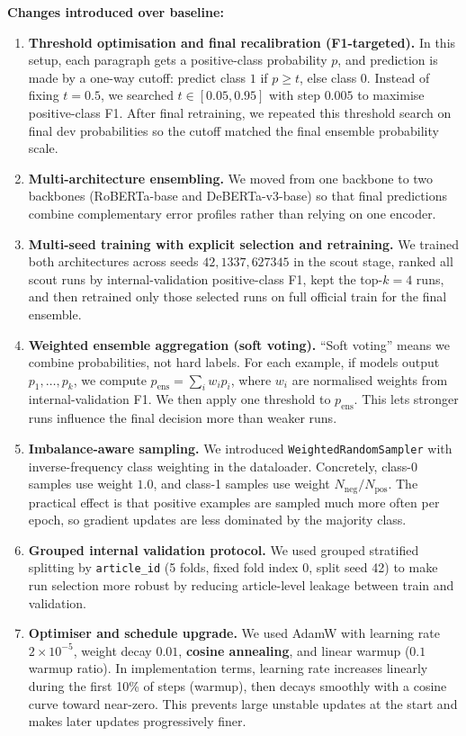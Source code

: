 \documentclass[11pt, a4paper]{article}
\begin{document}
\textbf{Changes introduced over baseline:}
\begin{enumerate}
  \item \textbf{Threshold optimisation and final recalibration (F1-targeted).} In this setup, each paragraph gets a positive-class probability \(p\), and prediction is made by a one-way cutoff: predict class \(1\) if \(p \ge t\), else class \(0\). Instead of fixing \(t=0.5\), we searched \(t \in [0.05, 0.95]\) with step \(0.005\) to maximise positive-class F1. After final retraining, we repeated this threshold search on final dev probabilities so the cutoff matched the final ensemble probability scale.
  \item \textbf{Multi-architecture ensembling.} We moved from one backbone to two backbones (RoBERTa-base and DeBERTa-v3-base) so that final predictions combine complementary error profiles rather than relying on one encoder.
  \item \textbf{Multi-seed training with explicit selection and retraining.} We trained both architectures across seeds \(42, 1337, 627345\) in the scout stage, ranked all scout runs by internal-validation positive-class F1, kept the top-\(k=4\) runs, and then retrained only those selected runs on full official train for the final ensemble.
  \item \textbf{Weighted ensemble aggregation (soft voting).} ``Soft voting'' means we combine probabilities, not hard labels. For each example, if models output \(p_1,\dots,p_k\), we compute \(p_{\text{ens}}=\sum_i w_i p_i\), where \(w_i\) are normalised weights from internal-validation F1. We then apply one threshold to \(p_{\text{ens}}\). This lets stronger runs influence the final decision more than weaker runs.
  \item \textbf{Imbalance-aware sampling.} We introduced \texttt{WeightedRandomSampler} with inverse-frequency class weighting in the dataloader. Concretely, class-0 samples use weight \(1.0\), and class-1 samples use weight \(N_{\text{neg}}/N_{\text{pos}}\). The practical effect is that positive examples are sampled much more often per epoch, so gradient updates are less dominated by the majority class.
  \item \textbf{Grouped internal validation protocol.} We used grouped stratified splitting by \texttt{article\_id} (5 folds, fixed fold index 0, split seed 42) to make run selection more robust by reducing article-level leakage between train and validation.
  \item \textbf{Optimiser and schedule upgrade.} We used AdamW with learning rate \(2\times10^{-5}\), weight decay \(0.01\), \textbf{cosine annealing}, and linear warmup (\(0.1\) warmup ratio). In implementation terms, learning rate increases linearly during the first 10\% of steps (warmup), then decays smoothly with a cosine curve toward near-zero. This prevents large unstable updates at the start and makes later updates progressively finer.

\end{enumerate}
\end{document}
